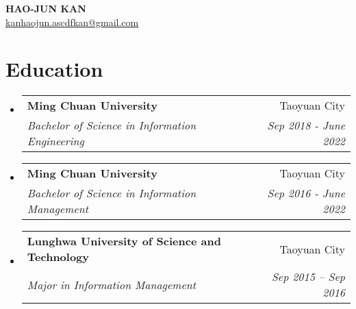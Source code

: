 \documentclass[letterpaper,11pt]{article}
\makeatletter
\newcommand{\resumeSubheading}[4]{
  \vspace{-2pt}\item
    \begin{tabular*}{0.97\textwidth}[t]{l@{\extracolsep{\fill}}r}
      \textbf{#1} & #2 \\
      \textit{\small#3} & \textit{\small #4} \\
    \end{tabular*}\vspace{-7pt}
}
\newcommand{\resumeSubHeadingListStart}{\begin{itemize}[leftmargin=0.15in, label={}]}
\newcommand{\resumeSubHeadingListEnd}{\end{itemize}}
\makeatother
\begin{document}

\begin{center}
    \textbf{\Huge \scshape HAO-JUN KAN} \\ \vspace{1pt}
    \small \href{mailto:kanhaojun.ascdfkan@gmail.com}{\underline{kanhaojun.ascdfkan@gmail.com}}
\end{center}


\section{Education}
  \resumeSubHeadingListStart
    \resumeSubheading
      {Ming Chuan University}{Taoyuan City}
      {Bachelor of Science in Information Engineering}{Sep 2018 - June 2022}
    \resumeSubheading
      {Ming Chuan University}{Taoyuan City}
      {Bachelor of Science in Information Management}{Sep 2016 - June 2022}
    \resumeSubheading
      {Lunghwa University of Science and Technology}{Taoyuan City}
      {Major in Information Management}{Sep 2015 – Sep 2016}
  \resumeSubHeadingListEnd


\end{document}
